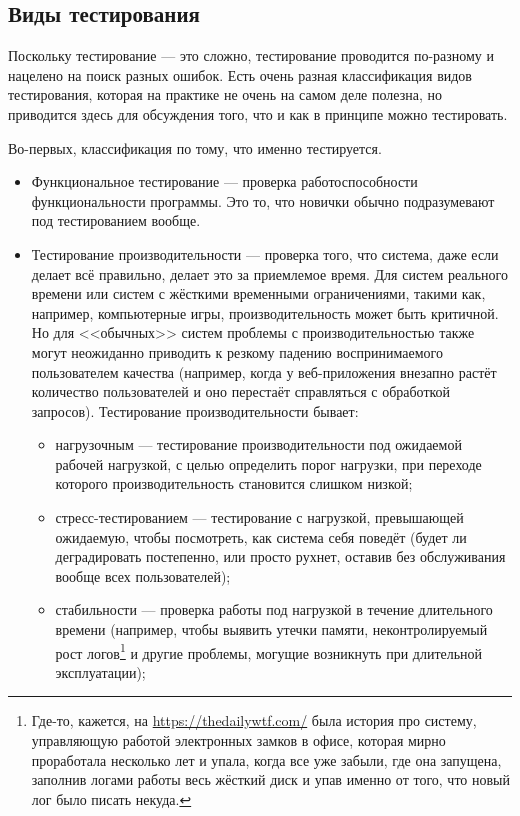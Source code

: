 \documentclass{../../text-style}
\begin{document}
\subsection{Виды тестирования}

Поскольку тестирование --- это сложно, тестирование проводится по-разному и нацелено на поиск разных ошибок. Есть очень разная классификация видов тестирования, которая на практике не очень на самом деле полезна, но приводится здесь для обсуждения того, что и как в принципе можно тестировать.

Во-первых, классификация по тому, что именно тестируется.

\begin{itemize}
    \item Функциональное тестирование --- проверка работоспособности функциональности программы. Это то, что новички обычно подразумевают под тестированием вообще.
    \item Тестирование производительности --- проверка того, что система, даже если делает всё правильно, делает это за приемлемое время. Для систем реального времени или систем с жёсткими временными ограничениями, такими как, например, компьютерные игры, производительность может быть критичной. Но для <<обычных>> систем проблемы с производительностью также могут неожиданно приводить к резкому падению воспринимаемого пользователем качества (например, когда у веб-приложения внезапно растёт количество пользователей и оно перестаёт справляться с обработкой запросов). Тестирование производительности бывает:
    \begin{itemize}
        \item нагрузочным --- тестирование производительности под ожидаемой рабочей нагрузкой, с целью определить порог нагрузки, при переходе которого производительность становится слишком низкой;
        \item стресс-тестированием --- тестирование с нагрузкой, превышающей ожидаемую, чтобы посмотреть, как система себя поведёт (будет ли деградировать постепенно, или просто рухнет, оставив без обслуживания вообще всех пользователей);
        \item стабильности --- проверка работы под нагрузкой в течение длительного времени (например, чтобы выявить утечки памяти, неконтролируемый рост логов\footnote{Где-то, кажется, на \url{https://thedailywtf.com/} была история про систему, управляющую работой электронных замков в офисе, которая мирно проработала несколько лет и упала, когда все уже забыли, где она запущена, заполнив логами работы весь жёсткий диск и упав именно от того, что новый лог было писать некуда.} и другие проблемы, могущие возникнуть при длительной эксплуатации);

\end{itemize}
\end{itemize}
\end{document}
